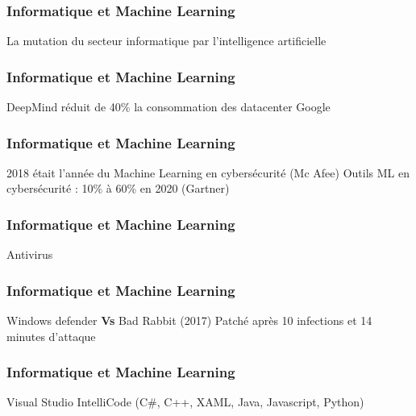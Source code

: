 \begin{frame}
  \frametitle{Informatique et Machine Learning}
  La mutation du secteur informatique par l'intelligence artificielle
\end{frame}

\begin{frame}
  \frametitle{Informatique et Machine Learning}
  DeepMind réduit de 40\% la consommation des datacenter Google
\end{frame}

\begin{frame}
  \frametitle{Informatique et Machine Learning}
  2018 était l'année du Machine Learning en cybersécurité (Mc Afee)
  \newline
  Outils ML en cybersécurité : 10\% à 60\% en 2020 (Gartner)
\end{frame}

\begin{frame}
  \frametitle{Informatique et Machine Learning}
  Antivirus 
  \newline
  \newline
  \begin{minipage}[c]{0.49\linewidth}
  \end{minipage}\hfill
  \begin{minipage}[c]{0.49\linewidth}
  \end{minipage}\hfill
\end{frame}

\begin{frame}
  \frametitle{Informatique et Machine Learning}
  Windows defender \textbf{Vs} Bad Rabbit (2017)
  \newline
  Patché après 10 infections et 14 minutes d'attaque
  \newline
  \newline
  \begin{minipage}[c]{0.49\linewidth}
  \end{minipage}\hfill
  \begin{minipage}[c]{0.49\linewidth}
  \end{minipage}\hfill
\end{frame}

\begin{frame}
  \frametitle{Informatique et Machine Learning}
  Visual Studio IntelliCode (C\#, C++, XAML, Java, Javascript, Python)
\end{frame}

